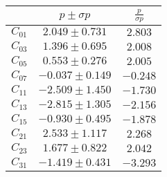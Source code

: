 
\begin{tabular}{c|c|c}
& $p \pm \sigma p$ & $\frac{p}{\sigma p}$ \\ \hline
$C_{01}$&$2.049\pm0.731$&$2.803$\\ 
$C_{03}$&$1.396\pm0.695$&$2.008$\\ 
$C_{05}$&$0.553\pm0.276$&$2.005$\\ 
$C_{07}$&$-0.037\pm0.149$&$-0.248$\\ 
$C_{11}$&$-2.509\pm1.450$&$-1.730$\\ 
$C_{13}$&$-2.815\pm1.305$&$-2.156$\\ 
$C_{15}$&$-0.930\pm0.495$&$-1.878$\\ 
$C_{21}$&$2.533\pm1.117$&$2.268$\\ 
$C_{23}$&$1.677\pm0.822$&$2.042$\\ 
$C_{31}$&$-1.419\pm0.431$&$-3.293$\\ 
\end{tabular}